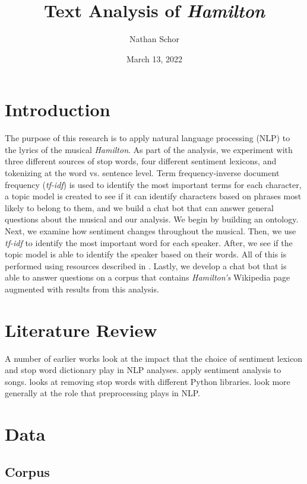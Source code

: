 \documentclass{article}
\title{Text Analysis of \emph{Hamilton}}
\author{Nathan Schor}
\date{March 13, 2022}
\begin{document}
\maketitle
\begin{singlespace}
\tableofcontents
\end{singlespace}

\section{Introduction}

The purpose of this research is to apply natural language processing (NLP) to the lyrics of the musical \emph{Hamilton}. As part of the analysis, we experiment with three different sources of stop words, four different sentiment lexicons, and tokenizing at the word vs. sentence level. Term frequency-inverse document frequency (\emph{tf-idf}) is used to identify the most important terms for each character, a topic model is created to see if it can identify characters based on phrases most likely to belong to them, and we build a chat bot that can answer general questions about the musical and our analysis. We begin by building an ontology. Next, we examine how sentiment changes throughout the musical. Then, we use \emph{tf-idf} to identify the most important word for each speaker. After, we see if the topic model is able to identify the speaker based on their words. All of this is performed using resources described in \cite{Silge2022}. Lastly, we develop a chat bot that is able to answer questions on a corpus that contains \emph{Hamilton's} Wikipedia page augmented with results from this analysis. 

\section{Literature Review}

A number of earlier works look at the impact that the choice of sentiment lexicon and stop word dictionary play in NLP analyses. \cite{shukla2017} apply sentiment analysis to songs. \cite{khanna2021} looks at removing stop words with different Python libraries. \cite{Yaavok2020} look more generally at the role that preprocessing plays in NLP.

\section{Data}

\subsection{Corpus}
\end{document}

